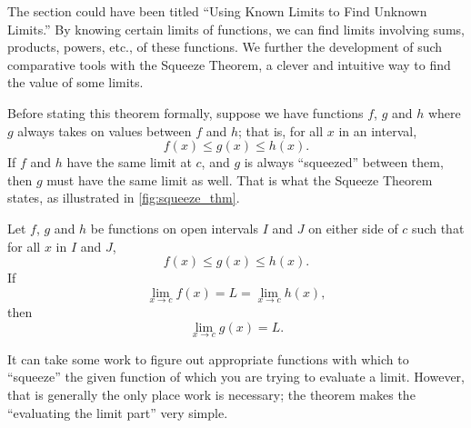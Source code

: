 The section could have been titled ``Using Known Limits to Find Unknown Limits.'' By knowing certain limits of functions, we can find limits involving sums, products, powers, etc., of these functions. We further the development of such comparative tools with the Squeeze Theorem, a clever and intuitive way to find the value of some limits.

Before stating this theorem formally, suppose we have functions $f$, $g$ and $h$ where $g$ always takes on values between $f$ and $h$; that is, for all $x$ in an interval,
\[f(x) \leq g(x) \leq h(x).\]
If $f$ and $h$ have the same limit at $c$, and $g$  is always ``squeezed'' between them, then $g$ must have the same limit as well. That is what the Squeeze Theorem states, as illustrated in \autoref{fig:squeeze_thm}.


\begin{theorem}\label{thm:sqz}
Let $f$, $g$ and $h$ be functions on open intervals $I$ and $J$ on either side of $c$ such that for all $x$ in $I$ and $J$,
\[f(x)\leq g(x) \leq h(x).\]
If
\[\lim_{x\to c} f(x) = L = \lim_{x\to c} h(x),\]
then
\[\lim_{x\to c} g(x) = L.\]
\end{theorem}


It can take some work to figure out appropriate functions with which to ``squeeze'' the given function of which you are trying to evaluate a limit. However, that is generally the only place work is necessary; the theorem makes the ``evaluating the limit part'' very simple. 

